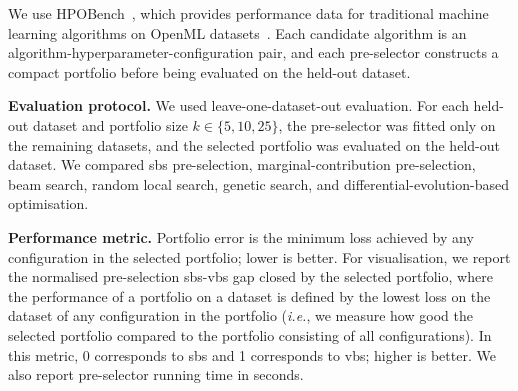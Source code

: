 We use HPOBench~\citep{EggEtAl21}, which provides performance data for traditional machine learning algorithms on OpenML datasets~\citep{BisEtAl21}. Each candidate algorithm is an algorithm-hyperparameter-configuration pair, and each pre-selector constructs a compact portfolio before being evaluated on the held-out dataset.

\textbf{Evaluation protocol.} We used leave-one-dataset-out evaluation. For each held-out dataset and portfolio size $k\in\{5,10,25\}$, the pre-selector was fitted only on the remaining datasets, and the selected portfolio was evaluated on the held-out dataset. We compared \gls{sbs} pre-selection, marginal-contribution pre-selection, beam search, random local search, genetic search, and differential-evolution-based optimisation.

\textbf{Performance metric.} Portfolio error is the minimum loss achieved by any configuration in the selected portfolio; lower is better. For visualisation, we report the normalised pre-selection \gls{sbs}-\gls{vbs} gap closed by the selected portfolio, where the performance of a portfolio on a dataset is defined by the lowest loss on the dataset of any configuration in the portfolio (\emph{i.e.}, we measure how good the selected portfolio compared to the portfolio consisting of all configurations). In this metric, 0 corresponds to \gls{sbs} and 1 corresponds to \gls{vbs}; higher is better. We also report pre-selector running time in seconds.



